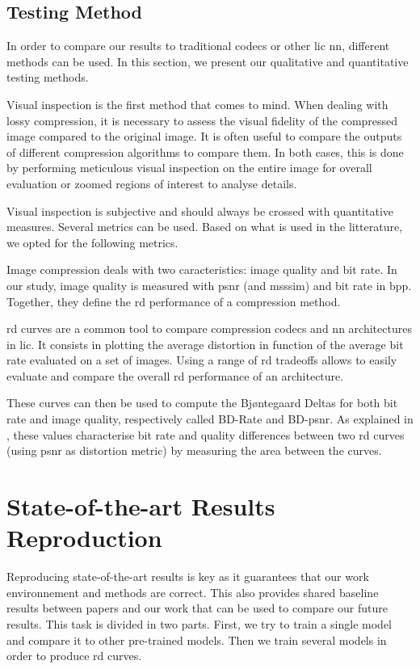 \subsection{Testing Method}
In order to compare our results to traditional codecs or other \acrshort{lic} \acrshort{nn}, different methods can be used. In this section, we present our qualitative and quantitative testing methods.

Visual inspection is the first method that comes to mind. When dealing with lossy compression, it is necessary to assess the visual fidelity of the compressed image compared to the original image. It is often useful to compare the outputs of different compression algorithms to compare them. In both cases, this is done by performing meticulous visual inspection on the entire image for overall evaluation or zoomed regions of interest to analyse details.

Visual inspection is subjective and should always be crossed with quantitative measures. Several metrics can be used. Based on what is used in the litterature, we opted for the following metrics.

Image compression deals with two caracteristics: image quality and bit rate. In our study, image quality is measured with \acrshort{psnr} (and \acrfull{msssim}) and bit rate in \acrfull{bpp}. Together, they define the \acrshort{rd} performance of a compression method.

\acrshort{rd} curves are a common tool to compare compression codecs and \acrshort{nn} architectures in \acrshort{lic}. It consists in plotting the average distortion in function of the average bit rate evaluated on a set of images. Using a range of \acrshort{rd} tradeoffs allows to easily evaluate and compare the overall \acrshort{rd} performance of an architecture.

These curves can then be used to compute the Bjøntegaard Deltas for both bit rate and image quality, respectively called BD-Rate and BD-\acrshort{psnr}. As explained in \cite{barman2024bjontegaarddeltabdtutorial}, these values characterise bit rate and quality differences between two \acrshort{rd} curves (using \acrshort{psnr} as distortion metric) by measuring the area between the curves. %

\section{State-of-the-art Results Reproduction}
Reproducing state-of-the-art results is key as it guarantees that our work environnement and methods are correct. This also provides shared baseline results between papers and our work that can be used to compare our future results. This task is divided in two parts. First, we try to train a single model and compare it to other pre-trained models. Then we train several models in order to produce \acrshort{rd} curves.

